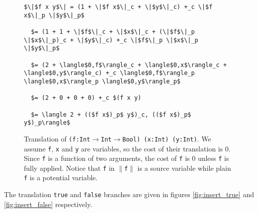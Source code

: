 \documentclass[12pt,letterpaper]{article}
\newcommand{\T}[1]{\texttt{#1}}
\begin{document}
\begin{figure}[H]
\caption{Translation of \T{(f:Int$\to$Int$\to$Bool) (x:Int) (y:Int)}.
\label{fig:fxy}
We assume \T{f}, \T{x} and \T{y} are variables, so the cost of their translation is 0.
Since \T{f} is a function of two arguments, the cost of \T{f} is 0 unless \T{f} is fully applied.
Notice that \T{f} in \T{$\|$f$\|$} is a source variable while plain \T{f} is a potential variable.
}
\begin{lstlisting}
$\|$f x y$\| = (1 + \|$f x$\|_c + \|$y$\|_c) +_c \|$f x$\|_p \|$y$\|_p$

  $= (1 + 1 + \|$f$\|_c + \|$x$\|_c + (\|$f$\|_p \|$x$\|_p)_c + \|$y$\|_c) +_c \|$f$\|_p \|$x$\|_p \|$y$\|_p$

  $= (2 + \langle$0,f$\rangle_c + \langle$0,x$\rangle_c + \langle$0,y$\rangle_c) +_c \langle$0,f$\rangle_p \langle$0,x$\rangle_p \langle$0,y$\rangle_p$

  $= (2 + 0 + 0 + 0) +_c $(f x y)

  $= \langle 2 + (($f x$)_p$ y$)_c, (($f x$)_p$ y$)_p\rangle$
\end{lstlisting}
\end{figure}

The translation \T{true} and \T{false} branches are given in figures \ref{fig:insert_true} and \ref{fig:insert_false} respectively.
\end{document}

